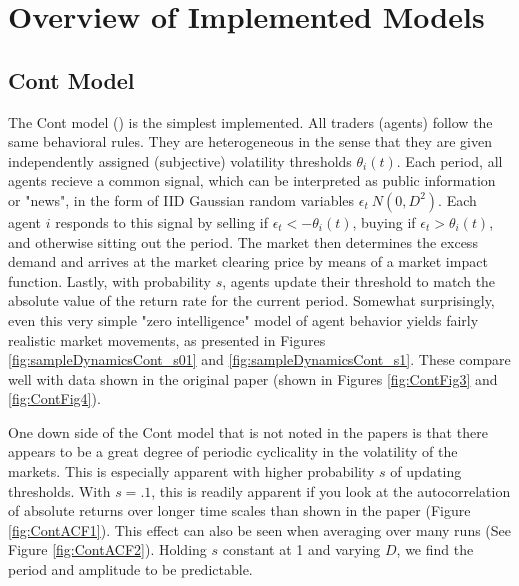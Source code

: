 \documentclass[runningheads]{llncs}
\begin{document}
\section{Overview of Implemented Models}

\subsection{Cont Model}

The Cont model (\cite{cont2006}) is the simplest implemented. All traders (agents) follow the same behavioral rules. They are heterogeneous in the sense that they are given independently assigned (subjective) volatility thresholds $\theta_i(t)$. Each period, all agents recieve a common signal, which can be interpreted as public information or "news", in the form of IID Gaussian random variables $\epsilon_t ~ N(0,D^2)$. Each agent $i$ responds to this signal by selling if $\epsilon_t < -\theta_i(t)$, buying if $\epsilon_t > \theta_i(t)$, and otherwise sitting out the period. The market then determines the excess demand and arrives at the market clearing price by means of a market impact function. Lastly, with probability $s$, agents update their threshold to match the absolute value of the return rate for the current period. Somewhat surprisingly, even this very simple "zero intelligence" model of agent behavior yields fairly realistic market movements, as presented in Figures \ref{fig:sampleDynamicsCont_s01} and \ref{fig:sampleDynamicsCont_s1}. These compare well with data shown in the original paper (shown in Figures \ref{fig:ContFig3} and \ref{fig:ContFig4}).

One down side of the Cont model that is not noted in the papers is that there appears to be a great degree of periodic cyclicality in the volatility of the markets. This is especially apparent with higher probability $s$ of updating thresholds. With $s=.1$, this is readily apparent if you look at the autocorrelation of absolute returns over longer time scales than shown in the paper (Figure \ref{fig:ContACF1}). This effect can also be seen when averaging over many runs (See Figure \ref{fig:ContACF2}). Holding $s$ constant at 1 and varying $D$, we find the period and amplitude to be predictable.
\end{document}
